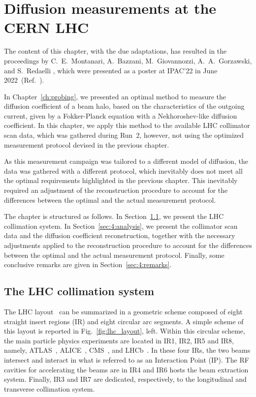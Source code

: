 \chapter{Diffusion measurements at the CERN LHC}\label{ch:diffusion_meas}
\noindent\textsf{The content of this chapter, with the due adaptations, has resulted in the proceedings by C.\ E.\ Montanari, A.\ Bazzani, M.\ Giovannozzi, A.\ A.\ Gorzawski, and S.\ Redaelli \textit{}, which were presented as a poster at IPAC'22 in June 2022~(Ref.~\cite{montanari:ipac22-mopost043}).}

\vspace{3em}

In Chapter~\ref{ch:probing}, we presented an optimal method to measure the diffusion coefficient of a beam halo, based on the characteristics of the outgoing current, given by a Fokker-Planck equation with a Nekhoroshev-like diffusion coefficient. In this chapter, we apply this method to the available LHC collimator scan data, which was gathered during Run~2, however, not using the optimized measurement protocol devised in the previous chapter.

As this measurement campaign was tailored to a different model of diffusion, the data was gathered with a different protocol, which inevitably does not meet all the optimal requirements highlighted in the previous chapter. This inevitably required an adjustment of the reconstruction procedure to account for the differences between the optimal and the actual measurement protocol.

The chapter is structured as follows. In Section~\ref{sec:4:collimation}, we present the LHC collimation system. In Section~\ref{sec:4:analysis}, we present the collimator scan data and the diffusion coefficient reconstruction, together with the necessary adjustments applied to the reconstruction procedure to account for the differences between the optimal and the actual measurement protocol. Finally, some conclusive remarks are given in Section~\ref{sec:4:remarks}.

\section{The LHC collimation system}\label{sec:4:collimation}

The LHC layout~\cite{Bruning:782076} can be summarized in a geometric scheme composed of eight straight insert regions (IR) and eight circular arc segments. A simple scheme of this layout is reported in Fig.~\ref{fig:lhc_layout}, left. Within this circular scheme, the main particle physics experiments are located in IR1, IR2, IR5 and IR8, namely, ATLAS~\cite{TheATLASCollaboration_2008}, ALICE~\cite{Alessandro:879894}, CMS~\cite{Chatrchyan:1129810}, and LHCb~\cite{Alves:1129809}. In these four IRs, the two beams intersect and interact in what is referred to as an Interaction Point (IP). The RF cavities for accelerating the beams are in IR4 and IR6 hosts the beam extraction system. Finally, IR3 and IR7 are dedicated, respectively, to the longitudinal and transverse collimation system.

